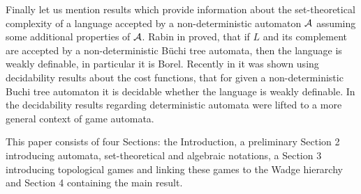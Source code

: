Finally let us mention results which provide information about the set-theoretical complexity of a language accepted by a non-deterministic automaton ${\mathcal A}$ assuming some additional properties of ${\mathcal A}$. Rabin in \cite{rabin} proved, that if $L$ and its complement are accepted by a non-deterministic Büchi tree automata, then the language is weakly definable, in particular it is Borel. Recently in \cite{cklvb} it was shown using decidability results about the cost functions, that for given a non-deterministic Buchi tree automaton it is decidable whether the language is weakly definable. In \cite{fms} the decidability results regarding deterministic automata were lifted to a more general context of game automata.

This paper consists of four Sections: the Introduction, a preliminary Section 2 introducing automata, set-theoretical and algebraic notations, a Section 3 introducing topological games and linking these games to the Wadge hierarchy and Section 4 containing the main result.
